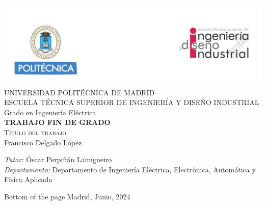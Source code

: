 \begin{center}
	
	\thispagestyle{empty}
		
	\includegraphics[width=1\textwidth]{figuras/cabecera.png}  \\[0.5 cm]
		
	\LARGE UNIVERSIDAD POLITÉCNICA DE MADRID \\ [1 cm]
		
	\LARGE ESCUELA TÉCNICA SUPERIOR DE INGENIERÍA Y DISEÑO INDUSTRIAL \\ [1 cm]
		
	\LARGE Grado en Ingeniería Eléctrica\\ [1 cm]
		
	\LARGE \textbf{TRABAJO FIN DE GRADO}\\[1 cm]
		
	\Huge \textsc{Título del trabajo}\\[1 cm]
		
	\LARGE Francisco Delgado López \\[2 cm]
		
			
	\begin{flushleft} \Large
		\emph{Tutor:} Óscar Perpiñán Lamigueiro\\
		\emph{Departamento:} Departamento de Ingeniería Eléctrica, Electrónica, Automática y Física Aplicada
	\end{flushleft}
			
	
	\vfill
		
	 Bottom of the page
	{\large Madrid, Junio, 2024}
		
\end{center}
	
\cleardoublepage 